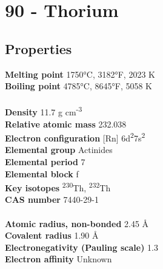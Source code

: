 \section{90 - Thorium}
\label{sec:elem-thorium}
\subsection{Properties}
\textbf{Melting point} 1750°C, 3182°F, 2023 K\\
\textbf{Boiling point} 4785°C, 8645°F, 5058 K\\
\\
\textbf{Density} 11.7 g cm\textsuperscript{-3}\\
\textbf{Relative atomic mass} 232.038\\
\textbf{Electron configuration} [Rn] 6d\textsuperscript{2}7s\textsuperscript{2}\\
\textbf{Elemental group} Actinides\\
\textbf{Elemental period} 7\\
\textbf{Elemental block} f\\
\textbf{Key isotopes} \textsuperscript{230}Th, \textsuperscript{232}Th\\
\textbf{CAS number} 7440-29-1\\
\\
\textbf{Atomic radius, non-bonded} 2.45 Å\\
\textbf{Covalent radius} 1.90 Å\\
\textbf{Electronegativity (Pauling scale)} 1.3\\
\textbf{Electron affinity} Unknown\\